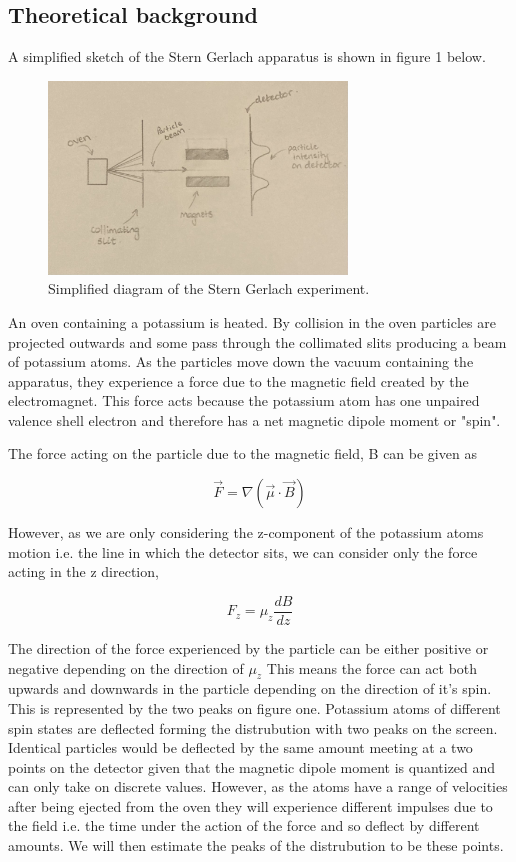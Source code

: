 \documentclass{article}%
\begin{document}
\subsection{Theoretical background}
A simplified sketch of the Stern Gerlach apparatus is shown in figure 1 below.
\begin{figure}[H]%
    \centering%
    \includegraphics[width=300px]{simply_sg.png}%
    \caption{Simplified diagram of the Stern Gerlach experiment.}%
\end{figure}

An oven containing a potassium is heated. By collision in the oven particles are projected outwards and some pass through the collimated slits producing a beam of potassium atoms.
As the particles move down the vacuum containing the apparatus, they experience a force due to the magnetic field created by the electromagnet. 
This force acts because the potassium atom has one unpaired valence shell electron and therefore has a net magnetic dipole moment or "spin". 

The force acting on the particle due to the magnetic field, B can be given as


\begin{equation}
    \vec{F} = \nabla(\vec{\mu} \cdot \vec{B} )
\end{equation}

However, as we are only considering the z-component of the potassium atoms motion i.e. the line in which the detector sits, we can consider only the force acting in the z direction,

\begin{equation}
    F_z = \mu_z \frac{dB}{dz}
\end{equation}

The direction of the force experienced by the particle can be either positive or negative depending on the direction of $\mu_z$ 
This means the force can act both upwards and downwards in the particle depending on the direction of it's spin.
This is represented by the two peaks on figure one. Potassium atoms of different spin states are deflected forming the distrubution with two peaks on the screen.
Identical particles would be deflected by the same amount meeting at a two points on the detector given that the magnetic dipole moment is quantized and can only take on discrete values.
However, as the atoms have a range of velocities after being ejected from the oven they will experience different impulses due to the field i.e. the time under the action of the force and so deflect by different amounts.
We will then estimate the peaks of the distrubution to be these points.
\end{document}
